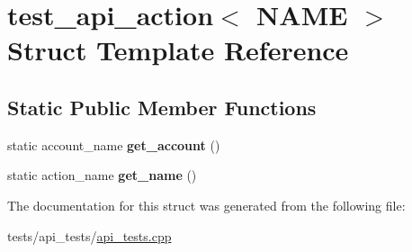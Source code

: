 \hypertarget{structtest__api__action}{}\section{test\+\_\+api\+\_\+action$<$ N\+A\+ME $>$ Struct Template Reference}
\label{structtest__api__action}
\subsection*{Static Public Member Functions}
\begin{DoxyCompactItemize}
\item 
\mbox{\label{structtest__api__action_a357b648cd19bad95ab2ff5d5b9203ca1}} 
static account\+\_\+name {\bfseries get\+\_\+account} ()
\item 
\mbox{\label{structtest__api__action_aaacc67317257f20a22ecf21c57a207cb}} 
static action\+\_\+name {\bfseries get\+\_\+name} ()
\end{DoxyCompactItemize}


The documentation for this struct was generated from the following file\+:\begin{DoxyCompactItemize}
\item 
tests/api\+\_\+tests/\mbox{\hyperlink{api__tests_8cpp}{api\+\_\+tests.\+cpp}}\end{DoxyCompactItemize}
